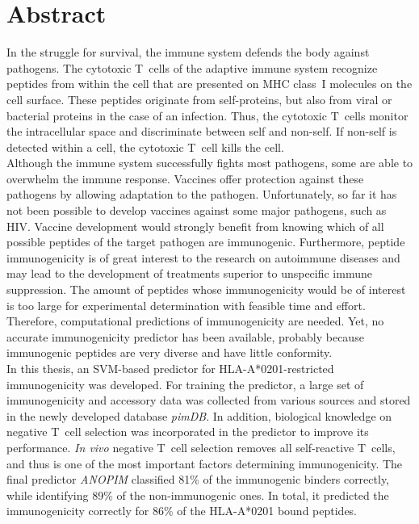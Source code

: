 \chapter*{Abstract}
\thispagestyle{empty} 

In the struggle for survival, the immune system defends the body against pathogens. The cytotoxic T~cells of the adaptive immune system recognize peptides from within the cell that are presented on MHC class~I molecules on the cell surface. These peptides originate from self-proteins, but also from viral or bacterial proteins in the case of an infection. Thus, the cytotoxic T~cells monitor the intracellular space and discriminate between self and non-self. If non-self is detected within a cell, the cytotoxic T~cell kills the cell.\\
Although the immune system successfully fights most pathogens, some are able to overwhelm the immune response. Vaccines offer protection against these pathogens by allowing adaptation to the pathogen. Unfortunately, so far it has not been possible to develop vaccines against some major pathogens, such as HIV. Vaccine development would strongly benefit from knowing which of all possible peptides of the target pathogen are immunogenic. Furthermore, peptide immunogenicity is of great interest to the research on autoimmune diseases and may lead to the development of treatments superior to unspecific immune suppression. The amount of peptides whose immunogenicity would be of interest is too large for experimental determination with feasible time and effort. Therefore, computational predictions of immunogenicity are needed. Yet, no accurate immunogenicity predictor has been available, probably because immunogenic peptides are very diverse and have little conformity.\\
In this thesis, an SVM-based predictor for HLA-A*0201-restricted immunogenicity was developed. For training the predictor, a large set of immunogenicity and accessory data was collected from various sources and stored in the newly developed database \textit{pimDB}. In addition, biological knowledge on negative T~cell selection was incorporated in the predictor to improve its performance. \textit{In vivo} negative T~cell selection removes all self-reactive T~cells, and thus is one of the most important factors determining immunogenicity. The final predictor \textit{ANOPIM} classified 81\% of the immunogenic binders correctly, while identifying 89\% of the non-immunogenic ones. In total, it predicted the immunogenicity correctly for 86\% of the HLA-A*0201 bound peptides.

